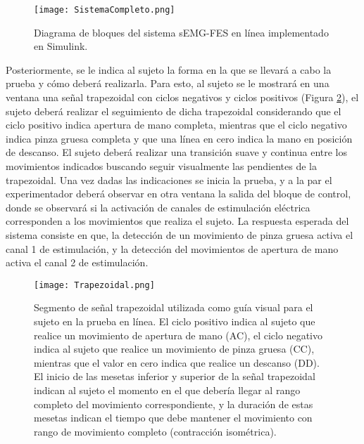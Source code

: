 \begin{figure}[htbp]
	\centering
	\texttt{[image: SistemaCompleto.png]}
	\caption{Diagrama de bloques del sistema sEMG-FES en línea implementado en Simulink\textregistered.}
	\label{Figura: SisComp}
\end{figure}

\newpage
Posteriormente, se le indica al sujeto la forma en la que se llevará a cabo la prueba y cómo deberá realizarla. Para esto, al sujeto se le mostrará en una ventana una señal trapezoidal con ciclos negativos y ciclos positivos (Figura \ref{Figura: Trapezoidal}), el sujeto deberá realizar el seguimiento de dicha trapezoidal considerando que el ciclo positivo indica apertura de mano completa, mientras que el ciclo negativo indica pinza gruesa completa y que una línea en cero indica la mano en posición de descanso. El sujeto deberá realizar una transición suave y continua entre los movimientos indicados buscando seguir visualmente las pendientes de la trapezoidal. Una vez dadas las indicaciones se inicia la prueba, y a la par el experimentador deberá observar en otra ventana la salida del bloque de control, donde se observará si la activación de canales de estimulación eléctrica corresponden a los movimientos que realiza el sujeto. La respuesta esperada del sistema consiste en que, la detección de un movimiento de pinza gruesa activa el canal 1 de estimulación, y la detección del movimientos de apertura de mano activa el canal 2 de estimulación.

\vfill
\begin{figure}[htbp]
	\centering
	\texttt{[image: Trapezoidal.png]}
	\caption[Segmento de señal trapezoidal patrón]{Segmento de señal trapezoidal utilizada como guía visual para el sujeto en la prueba en línea. El ciclo positivo indica al sujeto que realice un movimiento de apertura de mano (AC), el ciclo negativo indica al sujeto que realice un movimiento de pinza gruesa (CC), mientras que el valor en cero indica que realice un descanso (DD). El inicio de las mesetas inferior y superior de la señal trapezoidal indican al sujeto el momento en el que debería llegar al rango completo del movimiento correspondiente, y la duración de estas mesetas indican el tiempo que debe mantener el movimiento con rango de movimiento completo (contracción isométrica).}
	\label{Figura: Trapezoidal}
\end{figure}
\vfill

